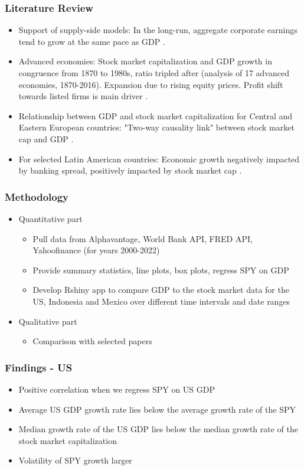 \documentclass{beamer}
\begin{document}
\begin{frame}
\frametitle{Literature Review}
\begin{itemize}
\item Support of supply-side models: In the long-run, aggregate corporate earnings tend to grow at the same pace as GDP \cite{barra_is_2010}. 
\item Advanced economies: Stock market capitalization and GDP growth in congruence from 1870 to 1980s, ratio tripled after (analysis of 17 advanced economies, 1870-2016). Expansion due to rising equity prices. Profit shift towards listed firms is main driver \cite{kuvshinov_big_2022}. 
\item Relationship between GDP and stock market capitalization for Central and Eastern European countries: "Two-way causality link" between stock market cap and GDP \cite{prats_does_2020}. \item For selected Latin American countries: Economic growth negatively impacted by banking spread, positively impacted by stock market cap  \cite{aali-bujari_impact_2017}. 
\end{itemize}
\end{frame}


\begin{frame}
\frametitle{Methodology}
\begin{itemize}
\item Quantitative part
\begin{itemize}

\item Pull data from Alphavantage, World Bank API, FRED API, Yahoofinance (for years 2000-2022)
\item Provide summary statistics, line plots, box plots, regress SPY on GDP 
\item Develop Rshiny app to compare GDP to the stock market data for the US, Indonesia and Mexico over different time intervals and date ranges
\end{itemize}
\item Qualitative part 
\begin{itemize}
    \item Comparison with selected papers 
\end{itemize}
\end{itemize}
\end{frame}


\begin{frame}
\frametitle{Findings - US}
\begin{itemize}
\item Positive correlation when we regress SPY on US GDP 
\item Average US GDP growth rate lies below the average growth rate of the SPY 
\item Median growth rate of the US GDP lies below the median growth rate of the stock market capitalization 
\item Volatility of SPY growth larger
\end{itemize}
\end{frame}
\end{document}
